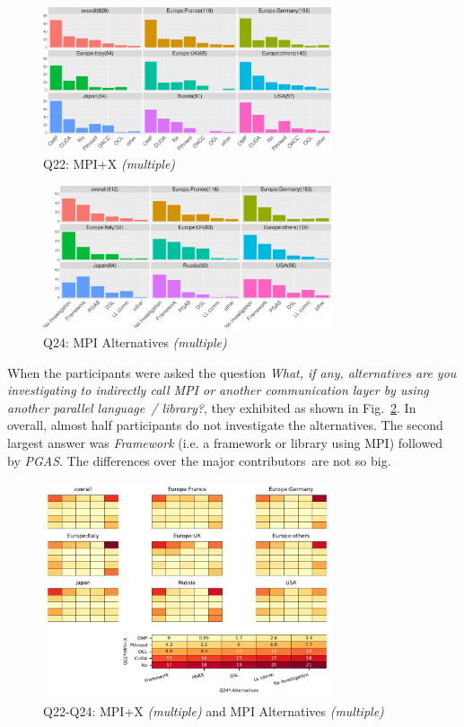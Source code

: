 \documentclass[preprint,5p,times]{elsarticle}
\def\myquote#1{{\it #1}}
\def\mcountries{major contributors\xspace{}}%
\begin{document}
\begin{figure}[htb]
\begin{center}
\includegraphics[width=8.5cm]{R-scripts/Q22.pdf}
\caption{Q22: MPI+X {\it(multiple)}}
\label{fig:mpi-x}
\end{center}
\end{figure}

\begin{figure}[htb]
\begin{center}
\includegraphics[width=8.5cm]{R-scripts/Q24.pdf}
\caption{Q24: MPI Alternatives {\it(multiple)}}
\label{fig:mpi-alternatives}
\end{center}
\end{figure}

When the participants were asked the question \myquote{What, if any,
alternatives are you investigating to indirectly call MPI or another
communication layer by using another parallel language~/ library?}, they
exhibited as shown in Fig.~\ref{fig:mpi-alternatives}. In overall,
almost half participants do not investigate the alternatives. The second
largest answer was \myquote{Framework} (i.e. a framework or library
using MPI) followed by \myquote{PGAS}. The
differences over the \mcountries\  are not so big.

\begin{figure}[htb]
\begin{center}
\includegraphics[width=8.5cm]{Figs/Q22-Q24.pdf}
\caption{Q22-Q24: MPI+X {\it(multiple)} and MPI Alternatives {\it(multiple)}}
\label{fig:mpi-x-and-alternatives}
\end{center}
\end{figure}
\end{document}
